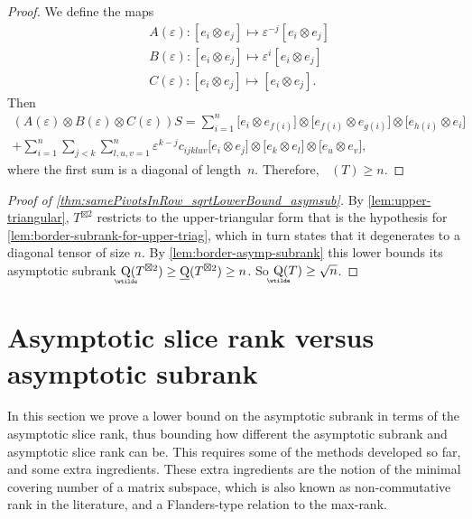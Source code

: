 \documentclass{daj}
\DeclareMathOperator{\asympsubrank}{\underaccent{\wtilde}{Q}}
\DeclareMathOperator{\bordersubrank}{\underline{Q}}
\newcommand{\eps}{\varepsilon}
\begin{document}
\begin{proof}
We define the maps
\begin{align*}
&A(\eps) : [e_i \otimes e_j] \mapsto \eps^{-j} [e_i \otimes e_j]\\
&B(\eps) : [e_i \otimes e_j] \mapsto \eps^{i} [e_i \otimes e_j]\\
&C(\eps) : [e_i \otimes e_j] \mapsto [e_i \otimes e_j].
\end{align*}
Then
\begin{multline*}
(A(\eps) \otimes B(\eps) \otimes C(\eps))S = 
\sum_{i=1}^n \big[e_i\otimes e_{f(i)}\big]\otimes\big[e_{f(i)}\otimes e_{g(i)}\big] \otimes \big[e_{h(i)}\otimes e_i\big]\\
+ \sum_{i=1}^n\sum_{j<k}\sum_{l,u,v=1}^n \eps^{k-j} c_{ijkluv}\big[e_i\otimes e_j\big]\otimes \big[e_k\otimes e_l\big]\otimes \big[e_u\otimes e_v],
\end{multline*}
where the first sum is a diagonal of length~$n$.
Therefore, $\bordersubrank(T) \geq n$.
\end{proof}

\begin{proof}[Proof of \autoref{thm:samePivotsInRow_sqrtLowerBound_asymsub}]
    By \autoref{lem:upper-triangular}, $T^{\boxtimes 2}$ restricts to the upper-triangular form that is the hypothesis for \autoref{lem:border-subrank-for-upper-triag}, which in turn states that it degenerates to a diagonal tensor of size $n$. By \autoref{lem:border-asymp-subrank} this lower bounds its asymptotic subrank $\asympsubrank(T^{\boxtimes 2})\geq\bordersubrank(T^{\boxtimes 2})\geq n$. So $\asympsubrank(T)\geq\sqrt{n}$.
\end{proof}





\section{Asymptotic slice rank versus asymptotic subrank}\label{slicerank-vs-subrank}


%

In this section we prove a lower bound on the asymptotic subrank in terms of the asymptotic slice rank, thus bounding how different the asymptotic subrank and asymptotic slice rank can be. This requires some of the methods developed so far, and some extra ingredients. These extra ingredients are the notion of the minimal covering number of a matrix subspace, which is also known as non-commutative rank in the literature, and a Flanders-type relation to the max-rank.
\end{document}
